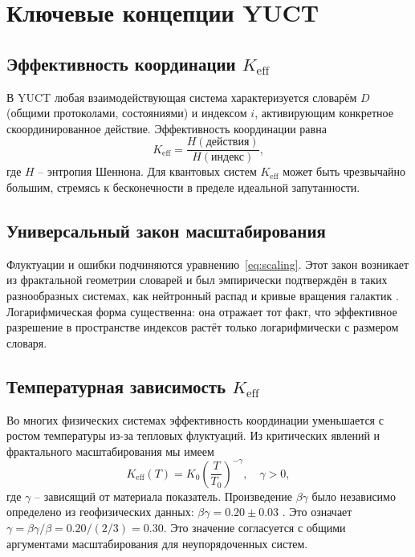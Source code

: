 \documentclass[12pt,a4paper]{article}
\newcommand{\Keff}{K_{\mathrm{eff}}}
\newcommand{\betagamma}{\beta\gamma}
\newcommand{\betac}{\beta}
\begin{document}
	\section{Ключевые концепции YUCT}
	
	\subsection{Эффективность координации \(\Keff\)}
	
	В YUCT любая взаимодействующая система характеризуется словарём \(D\) (общими протоколами, состояниями) и индексом \(i\), активирующим конкретное скоординированное действие. Эффективность координации равна
	\begin{equation}
		\Keff = \frac{H(\text{действия})}{H(\text{индекс})},
	\end{equation}
	где \(H\) – энтропия Шеннона. Для квантовых систем \(\Keff\) может быть чрезвычайно большим, стремясь к бесконечности в пределе идеальной запутанности.
	
	\subsection{Универсальный закон масштабирования}
	
	Флуктуации и ошибки подчиняются уравнению~\eqref{eq:scaling}. Этот закон возникает из фрактальной геометрии словарей и был эмпирически подтверждён в таких разнообразных системах, как нейтронный распад и кривые вращения галактик \cite{Yakushev2026c}. Логарифмическая форма существенна: она отражает тот факт, что эффективное разрешение в пространстве индексов растёт только логарифмически с размером словаря.
	
	\subsection{Температурная зависимость \(\Keff\)}
	
	Во многих физических системах эффективность координации уменьшается с ростом температуры из-за тепловых флуктуаций. Из критических явлений и фрактального масштабирования мы имеем
	\begin{equation}
		\Keff(T) = K_0 \left(\frac{T}{T_0}\right)^{-\gamma}, \quad \gamma > 0,
		\label{eq:K_T}
	\end{equation}
	где \(\gamma\) – зависящий от материала показатель. Произведение \(\betac\gamma\) было независимо определено из геофизических данных: \(\betagamma = 0.20 \pm 0.03\) \cite{Yakushev2026b}. Это означает \(\gamma = \betagamma / \betac = 0.20 / (2/3) = 0.30\). Это значение согласуется с общими аргументами масштабирования для неупорядоченных систем.
	
\end{document}
